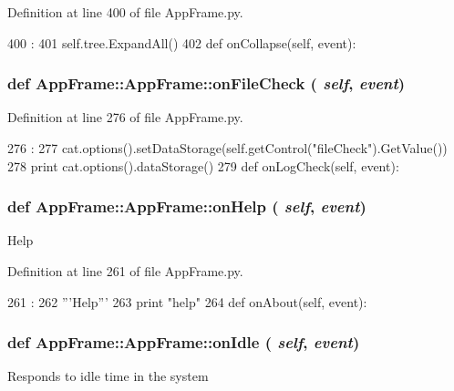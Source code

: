 Definition at line 400 of file AppFrame.py.


\begin{DoxyCode}
400                              :
401         self.tree.ExpandAll()
402 
    def onCollapse(self, event):
\end{DoxyCode}
\hypertarget{classAppFrame_1_1AppFrame_a64fced2976ba648b07d575749a031ce2}{
\subsubsection[{onFileCheck}]{\setlength{\rightskip}{0pt plus 5cm}def AppFrame::AppFrame::onFileCheck ( {\em self}, \/   {\em event})}}
\label{classAppFrame_1_1AppFrame_a64fced2976ba648b07d575749a031ce2}


Definition at line 276 of file AppFrame.py.


\begin{DoxyCode}
276                                 :
277         cat.options().setDataStorage(self.getControl("fileCheck").GetValue())
278         print cat.options().dataStorage()
279         
    def onLogCheck(self, event):
\end{DoxyCode}
\hypertarget{classAppFrame_1_1AppFrame_a11b969659be042b78227df2738371b6a}{
\subsubsection[{onHelp}]{\setlength{\rightskip}{0pt plus 5cm}def AppFrame::AppFrame::onHelp ( {\em self}, \/   {\em event})}}
\label{classAppFrame_1_1AppFrame_a11b969659be042b78227df2738371b6a}
\begin{DoxyVerb}Help\end{DoxyVerb}
 

Definition at line 261 of file AppFrame.py.


\begin{DoxyCode}
261                            :
262         '''Help'''
263         print "help"
264         
    def onAbout(self, event):
\end{DoxyCode}
\hypertarget{classAppFrame_1_1AppFrame_a4e0dcbd50e131b0098cf1611ad25db6c}{
\subsubsection[{onIdle}]{\setlength{\rightskip}{0pt plus 5cm}def AppFrame::AppFrame::onIdle ( {\em self}, \/   {\em event})}}
\label{classAppFrame_1_1AppFrame_a4e0dcbd50e131b0098cf1611ad25db6c}
\begin{DoxyVerb}Responds to idle time in the system\end{DoxyVerb}
 

